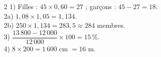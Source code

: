 \begin{multicols}{2}
1) Filles : $45\times0{,}60=27$ ; garçons : $45-27=18$.\\
2a) $1{,}08\times1{,}05=1{,}134$.\\
2b) $250\times1{,}134=283{,}5\approx284$ membres.\\
3) $\dfrac{13\,800-12\,000}{12\,000}\times100=15\,\%$.\\
4) $8\times200=1\,600$ cm $=16$ m.

\end{multicols}
\exercicesBanner
